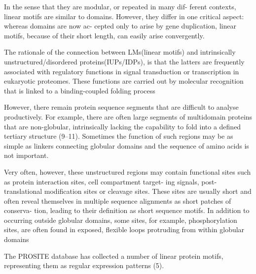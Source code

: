 In the sense that they are modular, or repeated in many dif-
ferent contexts, linear motifs are similar to domains. However,
they differ in one critical aspect: whereas domains are now ac-
cepted only to arise by gene duplication, linear motifs, because
of their short length, can easily arise convergently.


The rationale of the connection between LMs(linear motifs) and intrinsically unstructured/disordered proteins(IUPs/IDPs), is that the latters are frequently associated with
regulatory functions in signal transduction or transcription in eukaryotic proteomes. These functions are carried out by molecular recognition that is linked to a binding-coupled
folding process




However, there remain protein sequence segments that are difficult to analyse productively. 
For example, there are often large segments of multidomain proteins that are non-globular, intrinsically lacking the capability to fold into a defined tertiary
structure (9–11). Sometimes the function of such regions may be as simple as linkers connecting globular domains and the sequence of amino acids is not important.

Very often, however, these unstructured regions may contain functional
sites such as protein interaction sites, cell compartment target-
ing signals, post-translational modification sites or cleavage
sites. These sites are usually short and often reveal themselves
in multiple sequence alignments as short patches of conserva-
tion, leading to their definition as short sequence motifs. In
addition to occurring outside globular domains, some sites, for
example, phosphorylation sites, are often found in exposed,
flexible loops protruding from within globular domains

The PROSITE database has collected a number of linear
protein motifs, representing them as regular expression
patterns (5).




